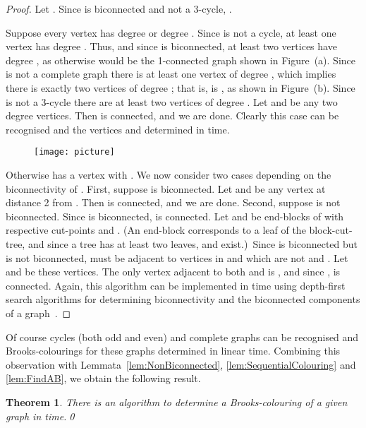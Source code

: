 \documentclass{article}
\newtheorem{theorem}{Theorem}
\begin{document}
\begin{proof}
Let . Since  is biconnected and not a 3-cycle, .

Suppose every vertex  has degree  or degree . Since  is not a
cycle, at least one vertex has degree . Thus, and since  is
biconnected, at least two vertices have degree , as otherwise  would
be  the 1-connected graph shown in Figure~(a). Since  is
not a complete graph there is at least one vertex of degree , which implies
there is exactly two vertices of degree ; that is,  is ,
as shown in Figure~(b). Since  is not a 3-cycle there are
at least two vertices of degree . Let  and  be any two degree 
vertices. Then  is connected, and we are done. Clearly this
case can be recognised and the vertices  and  determined in 
time. 

\begin{figure}[htb]
\begin{center}
\texttt{[image: picture]}
\end{center}
\end{figure}

Otherwise  has a vertex  with . We now consider two
cases depending on the biconnectivity of . First, suppose
 is biconnected. Let  and  be any vertex at distance 2
from . Then  is connected, and we are done. Second,
suppose  is not biconnected. Since  is biconnected,
 is connected. Let  and  be end-blocks of  with respective cut-points  and . (An end-block corresponds to a
leaf of the block-cut-tree, and since a tree has at least two leaves,  and
 exist.)\ Since  is biconnected but  is not biconnected,
 must be adjacent to vertices in  and  which are not  and
. Let  and  be these vertices. The only vertex adjacent to both 
and  is , and since ,  is connected.
Again, this algorithm can be implemented in  time using depth-first
search algorithms for determining biconnectivity and the biconnected components
of a graph~\cite{Tarjan72}. \end{proof}

Of course cycles (both odd and even) and complete graphs can be recognised and
Brooks-colourings for these graphs determined in linear time. Combining this
observation with Lemmata~\ref{lem:NonBiconnected},
\ref{lem:SequentialColouring} and \ref{lem:FindAB}, we obtain the following
result.

\begin{theorem}
There is an algorithm to determine a Brooks-colouring of a given graph  in
 time.\qed
\end{theorem}
\end{document}
